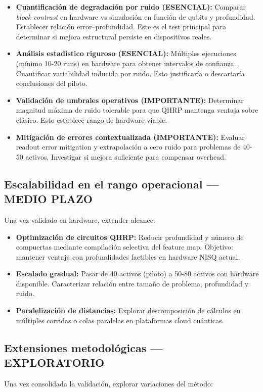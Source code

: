 \begin{itemize}
	\item \textbf{Cuantificación de degradación por ruido (ESENCIAL):} Comparar \textit{block contrast} en hardware vs simulación en función de qubits y profundidad. Establecer relación error--profundidad. Este es el test principal para determinar si mejora estructural persiste en dispositivos reales.
	\item \textbf{Análisis estadístico riguroso (ESENCIAL):} Múltiples ejecuciones (mínimo 10-20 runs) en hardware para obtener intervalos de confianza. Cuantificar variabilidad inducida por ruido. Esto justificaría o descartaría conclusiones del piloto.
	\item \textbf{Validación de umbrales operativos (IMPORTANTE):} Determinar magnitud máxima de ruido tolerable para que QHRP mantenga ventaja sobre clásico. Esto establece rango de hardware viable.
	\item \textbf{Mitigación de errores contextualizada (IMPORTANTE):} Evaluar readout error mitigation y extrapolación a cero ruido para problemas de 40-50 activos. Investigar si mejora suficiente para compensar overhead.
\end{itemize}

\subsection{Escalabilidad en el rango operacional — MEDIO PLAZO}
Una vez validado en hardware, extender alcance:\par

\begin{itemize}
	\item \textbf{Optimización de circuitos QHRP:} Reducir profundidad y número de compuertas mediante compilación selectiva del feature map. Objetivo: mantener ventaja con profundidades factibles en hardware NISQ actual.
	\item \textbf{Escalado gradual:} Pasar de 40 activos (piloto) a 50-80 activos con hardware disponible. Caracterizar relación entre tamaño de problema, profundidad y ruido.
	\item \textbf{Paralelización de distancias:} Explorar descomposición de cálculos en múltiples corridas o colas paralelas en plataformas cloud cuánticas.
\end{itemize}

\subsection{Extensiones metodológicas — EXPLORATORIO}
Una vez consolidada la validación, explorar variaciones del método:

